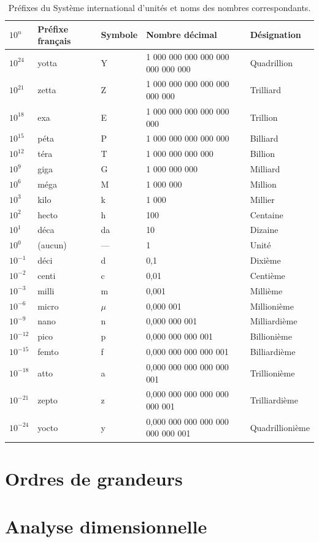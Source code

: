 \documentclass[a4paper,12pt]{book}
\begin{document}
\begin{table}
\begin{tabular}{|l|l|l|l|l|}
\hline
$10^n$&Préfixe français&Symbole&Nombre décimal&Désignation\\
\hline\hline
$10^{24}$&yotta&Y&1 000 000 000 000 000 000 000 000&Quadrillion\\
\hline
$10^{21}$&zetta&Z&1 000 000 000 000 000 000 000&Trilliard\\
\hline
$10^{18}$&exa&E&1 000 000 000 000 000 000&Trillion\\
\hline
$10^{15}$&péta&P&1 000 000 000 000 000&Billiard\\
\hline
$10^{12}$&téra&T&1 000 000 000 000&Billion\\
\hline
$10^{9}$&giga&G&1 000 000 000&Milliard\\
\hline
$10^{6}$&méga&M&1 000 000&Million\\
\hline
$10^{3}$&kilo&k&1 000&Millier\\
\hline
$10^{2}$&hecto&h&100&Centaine\\
\hline
$10^{1}$&déca&da&10&Dizaine\\
\hline
$10^{0}$&(aucun)&—&1&Unité\\
\hline
$10^{-1}$&déci&d&0,1&Dixième\\
\hline
$10^{-2}$&centi&c&0,01&Centième\\
\hline
$10^{-3}$&milli&m&0,001&Millième\\
\hline
$10^{-6}$&micro&$\mu$&0,000 001&Millionième\\
\hline
$10^{-9}$&nano&n&0,000 000 001&Milliardième\\
\hline
$10^{-12}$&pico&p&0,000 000 000 001&Billionième\\
\hline
$10^{-15}$&femto&f&0,000 000 000 000 001&Billiardième\\
\hline
$10^{-18}$&atto&a&0,000 000 000 000 000 001&Trillionième\\
\hline
$10^{-21}$&zepto&z&0,000 000 000 000 000 000 001&Trilliardième\\
\hline
$10^{-24}$&yocto&y&0,000 000 000 000 000 000 000 001&Quadrillionième\\
\hline
\end{tabular}
\caption{Préfixes du Système international d'unités et noms des nombres correspondants.}
\label{table_prefixe}
\end{table}

\section{Ordres de grandeurs}

\section{Analyse dimensionnelle}
\end{document}
